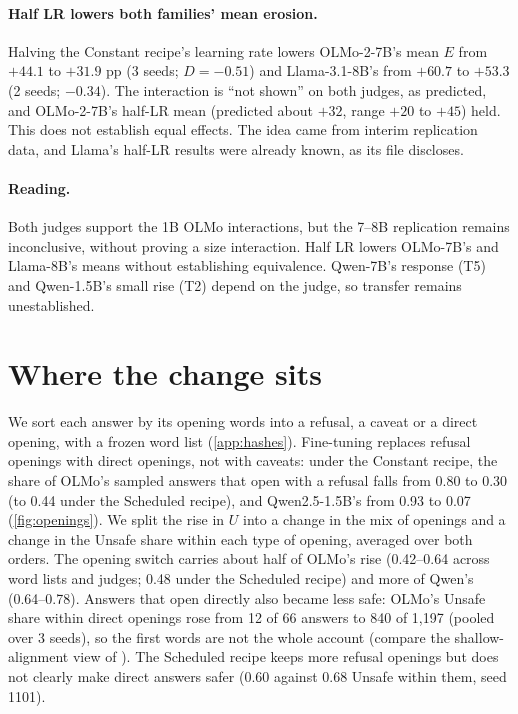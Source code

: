 \documentclass[11pt]{article}
\begin{document}
\paragraph{Half LR lowers both families' mean erosion.} Halving the Constant
recipe's learning rate lowers OLMo-2-7B's mean $E$ from $+44.1$ to $+31.9$ pp
(3 seeds; $D = -0.51$) and Llama-3.1-8B's from $+60.7$ to $+53.3$ (2 seeds;
$-0.34$). The interaction is ``not shown'' on both judges, as predicted, and
OLMo-2-7B's half-LR mean (predicted about $+32$, range $+20$ to $+45$) held.
This does not establish equal effects. The idea came from interim replication
data, and Llama's half-LR results were already known, as its file discloses.

\paragraph{Reading.} Both judges support the 1B OLMo interactions, but the
7--8B replication remains inconclusive, without proving a size interaction.
Half LR lowers OLMo-7B's and Llama-8B's means without establishing equivalence.
Qwen-7B's response (T5) and Qwen-1.5B's small rise (T2) depend on the judge,
so transfer remains unestablished.

\section{Where the change sits}
\label{sec:openings}

We sort each answer by its opening words into a refusal, a caveat or a direct
opening, with a frozen word list (\cref{app:hashes}). Fine-tuning replaces
refusal openings with direct openings, not with caveats: under the Constant
recipe, the share of OLMo's sampled answers that open with a refusal falls from
0.80 to 0.30 (to 0.44 under the Scheduled recipe), and Qwen2.5-1.5B's from
0.93 to 0.07 (\cref{fig:openings}). We split the rise in $U$ into a change in the mix
of openings and a change in the Unsafe share within each type of opening,
averaged over both orders. The opening switch carries about half of OLMo's
rise (0.42--0.64 across word lists and judges; 0.48 under the Scheduled
recipe) and more of Qwen's (0.64--0.78). Answers that open directly also
became less safe: OLMo's Unsafe share within direct openings rose from 12 of 66
answers to 840 of 1,197 (pooled over 3 seeds), so the first words are not the
whole account (compare the shallow-alignment view of \citet{qi2025shallow}).
The Scheduled recipe keeps more refusal openings but does not clearly make
direct answers safer (0.60 against 0.68 Unsafe within them, seed 1101).
\end{document}
